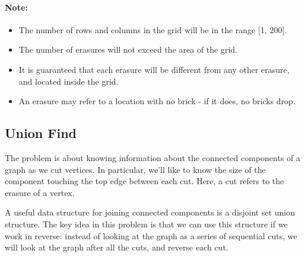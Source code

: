 \paragraph{Note:}

\begin{itemize}
\item The number of rows and columns in the grid will be in the range [1, 200].
\item The number of erasures will not exceed the area of the grid.
\item It is guaranteed that each erasure will be different from any other erasure, and located inside the grid.
\item An erasure may refer to a location with no brick - if it does, no bricks drop.
\end{itemize}

\subsection{Union Find}
The problem is about knowing information about the connected components of a graph as we cut vertices. In particular, we'll like to know the size of the component touching the top edge between each cut. Here, a cut refers to the erasure of a vertex.

A useful data structure for joining connected components is a disjoint set union structure. The key idea in this problem is that we can use this structure if we work in reverse: instead of looking at the graph as a series of sequential cuts, we will look at the graph after all the cuts, and reverse each cut.

